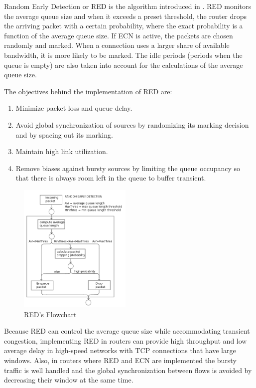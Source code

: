 Random Early Detection or RED is the algorithm introduced in
\cite{FloydJacobsonRED}. RED monitors the average queue size and when it
exceeds a preset threshold, the router drops the arriving packet with a
certain probability, where the exact probability is a function of the average
queue size. If \gls{ECN} is active, the packets are chosen randomly and marked. When
a connection uses a larger share of available bandwidth, it is more likely to
be marked. The idle periods (periods when the queue is empty) are also taken
into account for the calculations of the average queue size.

The objectives behind the  implementation of RED are:
\begin{enumerate}
\item Minimize packet loss and queue delay.
\item Avoid global synchronization of sources by randomizing its marking
decision and by spacing out its marking.
\item Maintain high link utilization.
\item Remove biases against bursty sources by limiting the queue occupancy so
that there is always room left in the queue to buffer transient.
\end{enumerate}

\begin{figure}
  \begin{center}
    \includegraphics[width=0.48\textwidth]{img/RED}
  \end{center}
  \caption{RED's Flowchart}
  \label{fig:RED}
\end{figure}

Because RED can control the average queue size while accommodating transient
congestion, implementing RED in routers can provide high throughput and low
average delay in high-speed networks with TCP connections that have large
windows. Also, in routers where RED and ECN are implemented the bursty traffic
is well handled and the global synchronization between flows is avoided by
decreasing their window at the same time.

